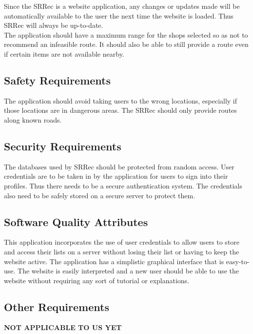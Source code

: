 \documentclass[10pt, a4paper, onecolumn]{scrartcl}
\begin{document}
		Since the SRRec is a website application, any changes or updates made will be automatically available to the user the next time the website is loaded. Thus SRRec will always be up-to-date.\\
		
		The application should have a maximum range for the shops selected so as not to recommend an infeasible route. It should also be able to still provide a route even if certain items are not available nearby.
		
		\subsection{Safety Requirements}
		
		The application should avoid taking users to the wrong locations, especially if those locations are in dangerous areas. The SRRec should only provide routes along known roads.
		
		\subsection{Security Requirements}
		
		The databases used by SRRec should be protected from random access. User credentials are to be taken in by the application for users to sign into their profiles. Thus there needs to be a secure authentication system. The credentials also need to be safely stored on a secure server to protect them.
		
		\subsection{Software Quality Attributes}
		
		This application incorporates the use of user credentials to allow users to store and access their lists on a server without losing their list or having to keep the website active. The application has a simplistic graphical interface that is easy-to-use. The website is easily interpreted and a new user should be able to use the website without requiring any sort of tutorial or explanations.
		
		\subsection{Other Requirements}
		
		\textbf{NOT APPLICABLE TO US YET}
		
	
	
	
\end{document}
